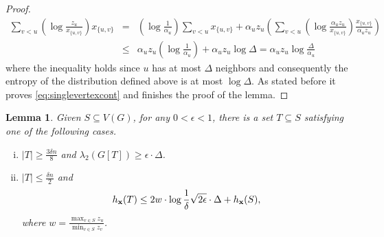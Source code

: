 \documentclass[11pt]{article}
\def\bx{{\bf x}}
\def\h{h}
\newtheorem{lemma}{Lemma}[section]
\begin{document}
\begin{proof}
\begin{eqnarray*}
\sum\limits_{v<u} \left(\log \frac{z_u}{x_{\{u,v\}}}\right)x_{\{u,v\}} &= & 
(\log \frac{1}{\alpha_u})\sum\limits_{v<u} x_{\{u,v\}}+ \alpha_u z_u \left(\sum_{v < u}\left(\log \frac{\alpha_u z_u}{ x_{\{u,v\}}}\right) \frac{x_{\{u,v\}}}{\alpha_u z_u}  \right) \\ &\leq &   \alpha_u z_u(\log \frac{1}{\alpha_u}) + \alpha_u z_u \log \Delta = \alpha_u z_u\log \frac{\Delta}{\alpha_u}
\end{eqnarray*}
where the inequality holds since $u$ has at most $\Delta$ neighbors and consequently  the entropy of the distribution defined above is at most $\log \Delta$.  
As stated before it  proves \eqref{eq:singlevertexcont} and 
finishes the proof of the lemma.
\end{proof}



\begin{lemma}
\label{lem:findingexpander}
Given $S \subseteq V(G)$, for any $0 < \epsilon < 1$, there is a set $T \subseteq S$ satisfying one of the following cases. 
\begin{enumerate}[i)]
\item \label{case:expander} $|T| \geq \frac{3\delta n}{8}$ and $\lambda_2(G[T]) \geq \epsilon \cdot \Delta$.
\item \label{case:nonexpanding} $|T| \leq \frac{\delta n}{2}$ and  \begin{equation}
\label{eq:nonexpandingset}
\h_\bx(T) \leq 2w\cdot\log \frac{1}{\delta}\sqrt{2\epsilon}\cdot \Delta+ \h_\bx(S),\end{equation} 
where $w = \frac{\max_{v \in S} z_u}{\min_{v \in S} z_v}$. 
\end{enumerate}
\end{lemma}
\end{document}
